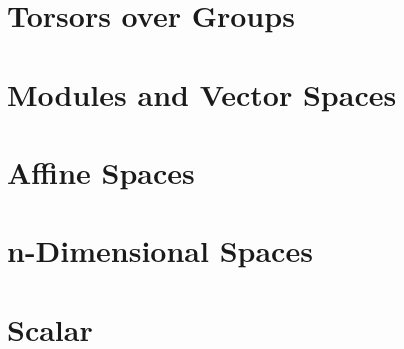 \documentclass{book}
\begin{document}
\hypertarget{pandoc.profile.debug__pandoc__debug__src__dmt1__lectures__l09_algebra__c03_torsors.lean.md}{}
\hypertarget{pandoc.profile.debug__pandoc__debug__src__dmt1__lectures__l09_algebra__c03_torsors.lean.md__torsors-over-groups}{%
\section{Torsors over Groups}\label{pandoc.profile.debug__pandoc__debug__src__dmt1__lectures__l09_algebra__c03_torsors.lean.md__torsors-over-groups}}

\hypertarget{pandoc.profile.debug__pandoc__debug__src__dmt1__lectures__l09_algebra__c04_vectorspaces.lean.md}{}
\hypertarget{pandoc.profile.debug__pandoc__debug__src__dmt1__lectures__l09_algebra__c04_vectorspaces.lean.md__modules-and-vector-spaces}{%
\section{Modules and Vector Spaces}\label{pandoc.profile.debug__pandoc__debug__src__dmt1__lectures__l09_algebra__c04_vectorspaces.lean.md__modules-and-vector-spaces}}

\hypertarget{pandoc.profile.debug__pandoc__debug__src__dmt1__lectures__l09_algebra__c05_affinespaces.lean.md}{}
\hypertarget{pandoc.profile.debug__pandoc__debug__src__dmt1__lectures__l09_algebra__c05_affinespaces.lean.md__affine-spaces}{%
\section{Affine Spaces}\label{pandoc.profile.debug__pandoc__debug__src__dmt1__lectures__l09_algebra__c05_affinespaces.lean.md__affine-spaces}}

\hypertarget{pandoc.profile.debug__pandoc__debug__src__dmt1__lectures__l09_algebra__c06_finitedimensional.lean.md}{}
\hypertarget{pandoc.profile.debug__pandoc__debug__src__dmt1__lectures__l09_algebra__c06_finitedimensional.lean.md__n-dimensional-spaces}{%
\section{n-Dimensional Spaces}\label{pandoc.profile.debug__pandoc__debug__src__dmt1__lectures__l09_algebra__c06_finitedimensional.lean.md__n-dimensional-spaces}}

\hypertarget{pandoc.profile.debug__pandoc__debug__src__dmt1__lectures__l10_algebra__scalar__scalar.lean.md}{}
\hypertarget{pandoc.profile.debug__pandoc__debug__src__dmt1__lectures__l10_algebra__scalar__scalar.lean.md__scalar}{%
\section{Scalar}\label{pandoc.profile.debug__pandoc__debug__src__dmt1__lectures__l10_algebra__scalar__scalar.lean.md__scalar}}
\end{document}
